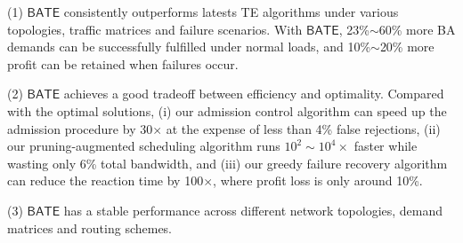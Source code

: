\documentclass[sigconf]{acmart}
\begin{document}
(1) $\mathsf{BATE}$ consistently outperforms latests TE algorithms under various topologies, traffic matrices and failure scenarios. With $\mathsf{BATE}$, 23\%$\sim$60\% more BA demands can be successfully fulfilled under normal loads, and 10\%$\sim$20\% more profit can be retained when failures occur.

(2) $\mathsf{BATE}$ achieves a good tradeoff between efficiency and optimality. 
Compared with the optimal solutions, (i) our admission control algorithm can speed up the admission procedure by 30$\times$ at the expense of less than 4\% false rejections, 
(ii) our pruning-augmented scheduling algorithm runs $10^2 \sim 10^4 \times$ faster while wasting only 6\% total bandwidth, 
and (iii) our greedy failure recovery algorithm can reduce the reaction time by 100$\times$, 
where profit loss is only around 10\%.

(3) $\mathsf{BATE}$ has a stable performance across different network topologies, 
demand matrices and routing schemes. 

\end{document}
